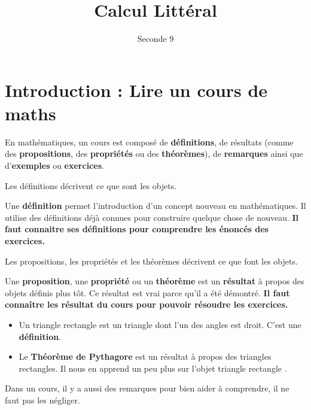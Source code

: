 \documentclass{poly}
\author{Seconde 9}
\date{}
\title{Calcul Littéral}
\begin{document}
\maketitle
\section{Introduction : Lire un cours de maths}
En mathématiques, un cours est composé de \textbf{définitions}, de résultats (comme des \textbf{propositions}, des \textbf{propriétés} ou des \textbf{théorèmes}), de \textbf{remarques} ainsi que d'\textbf{exemples} ou \textbf{exercices}. 

Les définitions décrivent ce que sont les objets.
\begin{tcolorbox}
Une \textbf{définition} permet l'introduction d'un concept nouveau en mathématiques. Il utilise des définitions déjà connues pour construire quelque chose de nouveau.
\tcblower
\textbf{Il faut connaitre ses définitions pour comprendre les énoncés des exercices.}
\end{tcolorbox}
Les propositions, les propriétés et les théorèmes décrivent ce que font les objets.
\begin{tcolorbox}[arc=0mm, colback=black!10]
Une \textbf{proposition}, une \textbf{propriété} ou un \textbf{théorème} est un \textbf{résultat} à propos des objets définis plus tôt. Ce résultat est vrai parce qu'il a été démontré.
\tcblower
\textbf{Il faut connaître les résultat du cours pour pouvoir résoudre les exercices.}
\end{tcolorbox}
\begin{example}
\hfill
\begin{itemize}
\item Un triangle rectangle est un triangle dont l'un des angles est droit. C'est une \textbf{définition}.
\item Le \textbf{Théorème de Pythagore} est un résultat à propos des triangles rectangles. Il nous en apprend un peu plus sur l'objet \og triangle rectangle \fg.
\end{itemize}
\end{example}
\begin{tcolorbox}[colback=white]
Dans un cours, il y a aussi des remarques pour bien aider à comprendre, il ne faut pas les négliger.
\end{tcolorbox}
\end{document}
